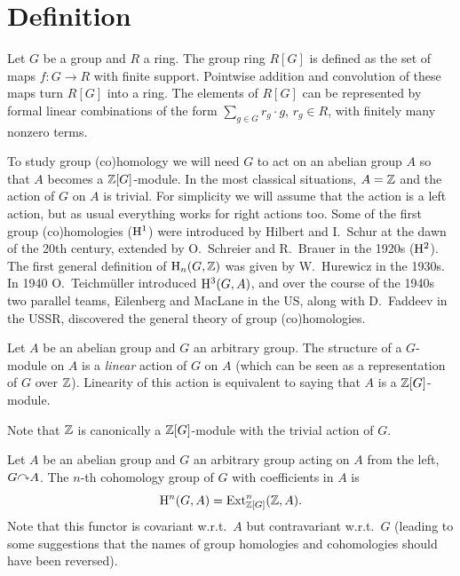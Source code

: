 \section{Definition}


\begin{defn}
    Let $G$ be a group and $R$ a ring. The group ring $R[G]$ is defined as the set of maps $f:G\to R$ with finite support. Pointwise addition and convolution of these maps turn $R[G]$ into a ring. The elements of $R[G]$ can be represented by formal linear combinations of the form $\sum_{g\in G} r_g\cdot g$, $r_g\in R$, with finitely many nonzero terms.
\end{defn}

To study group (co)homology we will need $G$ to act on an abelian group $A$ so that $A$ becomes a $\mathbb{Z}[G]$-module. In the most classical situations, $A=\mathbb{Z}$ and the action of $G$ on $A$ is trivial. For simplicity we will assume that the action is a left action, but as usual everything works for right actions too. Some of the first group (co)homologies ($\mathrm{H}^1$) were introduced by Hilbert and I.~Schur at the dawn of the 20th century, extended by O.~Schreier and R.~Brauer in the 1920s ($\mathrm{H}^2$). The first general definition of $\mathrm{H}_n(G,\mathbb{Z})$ was given by W.~Hurewicz in the 1930s. In 1940 O.~Teichm\"uller introduced $\mathrm{H}^3(G,A)$, and over the course of the 1940s two parallel teams, Eilenberg and MacLane in the US, along with D.~Faddeev in the USSR, discovered the general theory of group (co)homologies.

\begin{defn}[$G$-module]
    Let $A$ be an abelian group and $G$ an arbitrary group. The structure of a $G$-module on $A$ is a \emph{linear} action of $G$ on $A$ (which can be seen as a representation of $G$ over $\mathbb{Z}$). Linearity of this action is equivalent to saying that $A$ is a $\mathbb{Z}[G]$-module.

    Note that $\mathbb{Z}$ is canonically a $\mathbb{Z}[G]$-module with the trivial action of $G$.
\end{defn}

\begin{defn}
    Let $A$ be an abelian group and $G$ an arbitrary group acting on $A$ from the left, $G\acts A$. The $n$-th cohomology group of $G$ with coefficients in $A$ is
    \[\mathrm{H}^n(G,A)=\operatorname{Ext}_{\mathbb{Z}[G]}^n(\mathbb{Z},A).\]
    Note that this functor is covariant w.r.t.\ $A$ but contravariant w.r.t.\ $G$ (leading to some suggestions that the names of group homologies and cohomologies should have been reversed). 
\end{defn}

